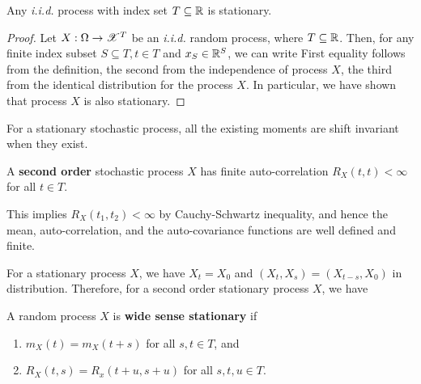 \documentclass[letterpaper,10pt,english]{article}
\begin{document}
\begin{shaded}
\begin{lem} 
Any \emph{i.i.d.} process with index set $T \subseteq \mathbb{R}$ is stationary.
\end{lem}
\begin{proof}
Let $X: \Omega \to \mathscr{X}^T$ be an \emph{i.i.d.} random process, where $T \subseteq \mathbb{R}$. 
Then, for any finite index subset $S \subseteq T, t \in T$ and $x_S \in \mathbb{R}^S$, we can write 
\EQ{
F_{X_S}(x_S) 
= P(\bigcap_{s \in S}\set{X_s \le x_s}) 
= \prod_{s \in S}P\circ X_s^{-1}(-\infty, x_s] 
= \prod_{s \in S}P\circ X_{t+s}^{-1}(-\infty, x_s] 
= P(\bigcap_{s \in t+S}\set{X_s \le x_s})  
= F_{X_{t+S}}(x_S).
}
First equality follows from the definition, the second from the independence of process $X$, 
the third from the identical distribution for the process $X$. 
In particular, we have shown that process $X$ is also stationary. 
\end{proof}
\end{shaded}
\begin{rem}
For a stationary stochastic process, all the existing moments are shift invariant when they exist.  
\end{rem}
\begin{defn}
A \textbf{second order} stochastic process $X$ has finite auto-correlation $R_X(t,t) < \infty$ for all %
$t \in T$. 
\end{defn}
\begin{rem}
This implies $R_X(t_1, t_2) < \infty$ by Cauchy-Schwartz inequality, 
and hence the mean, auto-correlation, and the auto-covariance functions are well defined and finite. 
\end{rem}
\begin{rem}
For a stationary process $X$, we have $X_t = X_0$ and $(X_t,X_s) = (X_{t-s}, X_{0})$ in distribution. 
Therefore, for a second order stationary process $X$, we have 
\end{rem}
\begin{defn}
A random process $X$ is \textbf{wide sense stationary} if 
\begin{enumerate}
\item $m_X(t) = m_X(t+s)$ for all $s,t \in T$, and 
\item $R_X(t,s) = R_x(t+u, s+u)$ for all $s,t,u \in T$. 
\end{enumerate} 
\end{defn}
\end{document}
